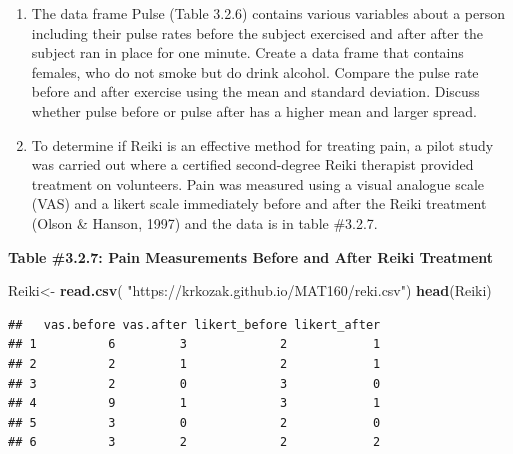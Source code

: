 \documentclass[
]{book}
\newenvironment{Shaded}{\begin{snugshade}}{\end{snugshade}}
\newcommand{\KeywordTok}[1]{\textcolor[rgb]{0.13,0.29,0.53}{\textbf{#1}}}
\newcommand{\NormalTok}[1]{#1}
\newcommand{\OperatorTok}[1]{\textcolor[rgb]{0.81,0.36,0.00}{\textbf{#1}}}
\newcommand{\StringTok}[1]{\textcolor[rgb]{0.31,0.60,0.02}{#1}}
\begin{document}
\begin{Shaded}
\end{Shaded}

\begin{enumerate}
\def\labelenumi{\arabic{enumi}.}
\setcounter{enumi}{5}
\item
  The data frame Pulse (Table 3.2.6) contains various variables about a person including their pulse rates before the subject exercised and after after the subject ran in place for one minute. Create a data frame that contains females, who do not smoke but do drink alcohol. Compare the pulse rate before and after exercise using the mean and standard deviation. Discuss whether pulse before or pulse after has a higher mean and larger spread.
\item
  To determine if Reiki is an effective method for treating pain, a pilot study was carried out where a certified second-degree Reiki therapist provided treatment on volunteers. Pain was measured using a visual analogue scale (VAS) and a likert scale immediately before and after the Reiki treatment (Olson \& Hanson, 1997) and the data is in table \#3.2.7.
\end{enumerate}

\textbf{Table \#3.2.7: Pain Measurements Before and After Reiki Treatment}

\begin{Shaded}
\begin{Highlighting}[]
\NormalTok{Reiki<-}\StringTok{ }\KeywordTok{read.csv}\NormalTok{(}
  \StringTok{"https://krkozak.github.io/MAT160/reki.csv"}\NormalTok{)}
\KeywordTok{head}\NormalTok{(Reiki)}
\end{Highlighting}
\end{Shaded}

\begin{verbatim}
##   vas.before vas.after likert_before likert_after
## 1          6         3             2            1
## 2          2         1             2            1
## 3          2         0             3            0
## 4          9         1             3            1
## 5          3         0             2            0
## 6          3         2             2            2
\end{verbatim}
\end{document}
